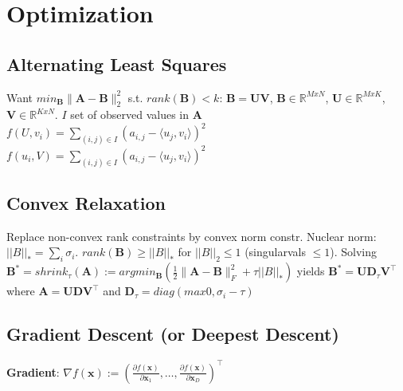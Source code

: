 \section{Optimization}

\subsection*{Alternating Least Squares}
Want $min_\mathbf{B}\|\mathbf{A} - \mathbf{B}\|^2_2 $ s.t. $rank(\mathbf{B}) < k$: $\mathbf{B}=\mathbf{UV}$, $\mathbf{B} \in \mathbb{R}^{MxN}$, $\mathbf{U} \in \mathbb{R}^{MxK}$, $\mathbf{V} \in \mathbb{R}^{KxN}$. $I$ set of observed values in $\mathbf{A}$\\
$f(U,v_i)=\sum_{(i,j)\in I} (a_{i,j} - \langle u_j, v_i \rangle)^2$\\
$f(u_i,V)=\sum_{(i,j)\in I} (a_{i,j} - \langle u_j, v_i \rangle)^2$
\subsection*{Convex Relaxation}
Replace non-convex rank constraints by convex norm constr. Nuclear norm: $||B||_* = \sum_i \sigma_i$. $rank(\mathbf{B}) \geq ||B||_*$ for $||B||_2 \leq 1$ (singularvals $\leq 1$). 
Solving $\mathbf{B}^* = shrink_\tau(\mathbf{A}) := argmin_\mathbf{B}(\frac{1}{2}\|\mathbf{A} - \mathbf{B}\|^2_F + \tau||B||_*)$ yields $\mathbf{B}^* = \mathbf{U}\mathbf{D}_\tau\mathbf{V}^\top$ where $\mathbf{A} = \mathbf{UDV}^\top $ and $\mathbf{D}_\tau = diag(max{0, \sigma_i - \tau})$

\subsection*{Gradient Descent (or Deepest Descent)}
\textbf{Gradient}: $\nabla f(\mathbf{x}) := \left( \frac{\partial f(\mathbf{x})}{\partial \mathbf{x}_1}, \ldots, \frac{\partial f(\mathbf{x})}{\partial \mathbf{x}_D} \right)^\top$

